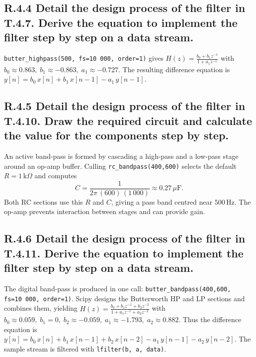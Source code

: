 \documentclass{article}
\begin{document}
\subsection*{R.4.4 Detail the design process of the filter in T.4.7. Derive the equation to implement the filter step by step on a data stream.}

\texttt{butter\_highpass(500, fs=10\,000, order=1)} gives
\( H(z)=\frac{b_0+b_1z^{-1}}{1+a_1z^{-1}} \) with
\( b_0\approx0.863,\; b_1\approx-0.863,\; a_1\approx-0.727. \)
The resulting difference equation is  
\( y[n]=b_0\,x[n]+b_1\,x[n-1]-a_1\,y[n-1]. \)

\subsection*{R.4.5 Detail the design process of the filter in T.4.10. Draw the required circuit and calculate the value for the components step by step.}

An active band-pass is formed by cascading a high-pass and a low-pass stage around an op-amp buffer.
Calling \texttt{rc\_bandpass(400,600)} selects the default $R=1\,\mathrm{k}\Omega$ and computes
\[
C=\frac{1}{2\pi\,(600)\,(1\,000)}\approx0.27\,\mu\mathrm{F}.
\]
Both RC sections use this $R$ and $C$, giving a pass band centred near $500\,$Hz. The op-amp prevents interaction between stages and can provide gain.

\subsection*{R.4.6 Detail the design process of the filter in T.4.11. Derive the equation to implement the filter step by step on a data stream.}

The digital band-pass is produced in one call:
\texttt{butter\_bandpass(400,600, fs=10\,000, order=1)}.
Scipy designs the Butterworth HP and LP sections and combines them, yielding
\(
  H(z)=\frac{b_0+b_1z^{-1}+b_2z^{-2}}{1+a_1z^{-1}+a_2z^{-2}}
\)
with
\(b_0\approx0.059,\; b_1=0,\; b_2\approx-0.059,\; a_1\approx-1.793,\; a_2\approx0.882\).
Thus the difference equation is
\(y[n]=b_0\,x[n]+b_1\,x[n-1]+b_2\,x[n-2]-a_1\,y[n-1]-a_2\,y[n-2].\)
The sample stream is filtered with \texttt{lfilter(b, a, data)}.

\end{document}
